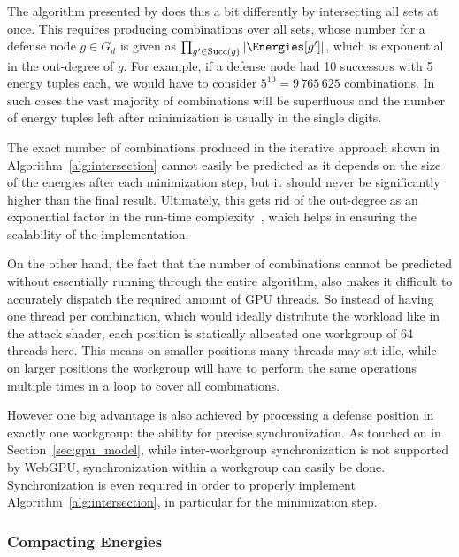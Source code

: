 The algorithm presented by \textcite{bisping2023process} does this a bit
differently by intersecting all sets at once.
This requires producing combinations over all sets,
whose number for a defense node $g \in G_d$ is given as
$\prod_{g' \in \mathrm{Succ}(g)} |\Energies[g']|$,
which is exponential in the out-degree of $g$.
For example, if a defense node had 10 successors with 5 energy tuples each,
we would have to consider $5^{10} = 9\,765\,625$ combinations.
In such cases the vast majority of combinations will be superfluous and
the number of energy tuples left after minimization is usually in the single
digits.

The exact number of combinations produced in the iterative approach shown in
Algorithm~\ref{alg:intersection} cannot easily be predicted as it depends on
the size of the energies after each minimization step,
but it should never be significantly higher than the final result.
Ultimately, this gets rid of the out-degree as an exponential factor in the
run-time complexity~\cite{brihaye2023multi},
which helps in ensuring the scalability of the implementation.

On the other hand, the fact that the number of combinations cannot be predicted
without essentially running through the entire algorithm,
also makes it difficult to accurately dispatch the required amount of GPU
threads.
So instead of having one thread per combination,
which would ideally distribute the workload like in the attack shader,
each position is statically allocated one workgroup of 64 threads here.
This means on smaller positions many threads may sit idle,
while on larger positions the workgroup will have to perform the same
operations multiple times in a loop to cover all combinations.

However one big advantage is also achieved by processing a defense position in
exactly one workgroup:
the ability for precise synchronization.
As touched on in Section~\ref{sec:gpu_model},
while inter-workgroup synchronization is not supported by \mbox{WebGPU},
synchronization within a workgroup can easily be done.
Synchronization is even required in order to properly implement
Algorithm~\ref{alg:intersection}, in particular for the minimization step.

\subsubsection{Compacting Energies}

